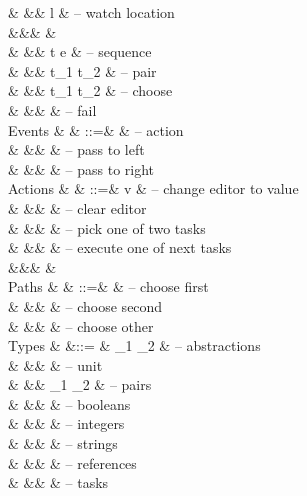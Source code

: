 \begin{grammar}
    &        &\mid& \Watch l                    & – watch location \\
    &&\grayed{\mid}&           &  \\
    &        &\mid& t \Cont e                   & – sequence \\
    &        &\mid& t_1 \And t_2                & – pair \\
    &        &\mid& t_1 \Or t_2                 & – choose \\
    &        &\mid& \Fail                       & – fail \\
  Events
    & \eta   & ::=& \alpha                      & – action \\
    &        &\mid& \Left \eta                  & – pass to left \\
    &        &\mid& \Right \eta                 & – pass to right \\
  Actions
    & \alpha & ::=& v                           & – change editor to value \\
    &        &\mid& \Clear                      & – clear editor \\
    &        &\mid& \Pick \pi                   & – pick one of two tasks \\
    &        &\mid& \Execute \pi                & – execute one of next tasks \\
    &&\grayed{\mid}& \grayed{\Next}             &  \\
  Paths
    & \pi    & ::=& \First                      & – choose first \\
    &        &\mid& \Second                     & – choose second \\
    &        &\mid& \Other \pi                  & – choose other \\
  Types
    & \tau   &::= & \tau_1 \to \tau_2           & – abstractions \\
    &        &\mid& \Unit                       & – unit \\
    &        &\mid& \tau_1 \times \tau_2        & – pairs \\
    &        &\mid& \Bool                       & – booleans \\
    &        &\mid& \Int                        & – integers \\
    &        &\mid& \String                     & – strings \\
    &        &\mid& \Reference \tau             & – references \\
    &        &\mid& \Task \tau                  & – tasks \\
\end{grammar}


